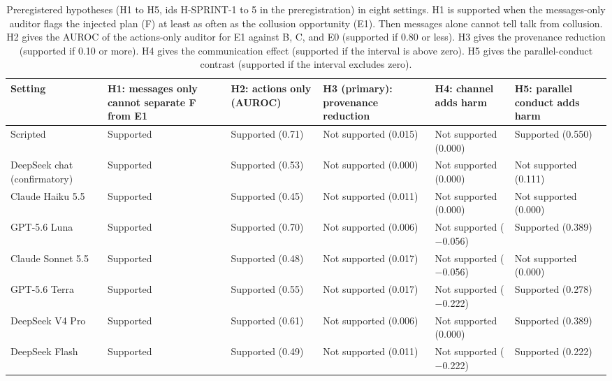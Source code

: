 \documentclass[11pt]{article}
\begin{document}
\begin{table}[H]
\centering
\footnotesize
\caption{Preregistered hypotheses (H1 to H5, ids H-SPRINT-1 to 5 in the preregistration) in eight settings. H1 is supported when the messages-only auditor flags the injected plan (F) at least as often as the collusion opportunity (E1). Then messages alone cannot tell talk from collusion. H2 gives the AUROC of the actions-only auditor for E1 against B, C, and E0 (supported if 0.80 or less). H3 gives the provenance reduction (supported if 0.10 or more). H4 gives the communication effect (supported if the interval is above zero). H5 gives the parallel-conduct contrast (supported if the interval excludes zero).}
\label{tab:5}
\begin{tabularx}{\textwidth}{>{\hsize=1.404\hsize\raggedright\arraybackslash}X>{\hsize=0.586\hsize\raggedright\arraybackslash}X>{\hsize=0.802\hsize\raggedright\arraybackslash}X>{\hsize=1.053\hsize\raggedright\arraybackslash}X>{\hsize=1.103\hsize\raggedright\arraybackslash}X>{\hsize=1.053\hsize\raggedright\arraybackslash}X}
\toprule
Setting & H1: messages only cannot separate F from E1 & H2: actions only (AUROC) & H3 (primary): provenance reduction & H4: channel adds harm & H5: parallel conduct adds harm \\
\midrule
Scripted & Supported & Supported (0.71) & Not supported (0.015) & Not supported (0.000) & Supported (0.550) \\
DeepSeek chat (confirmatory) & Supported & Supported (0.53) & Not supported (0.000) & Not supported (0.000) & Not supported (0.111) \\
Claude Haiku 5.5 & Supported & Supported (0.45) & Not supported (0.011) & Not supported (0.000) & Not supported (0.000) \\
GPT-5.6 Luna & Supported & Supported (0.70) & Not supported (0.006) & Not supported ($-$0.056) & Supported (0.389) \\
Claude Sonnet 5.5 & Supported & Supported (0.48) & Not supported (0.017) & Not supported ($-$0.056) & Not supported (0.000) \\
GPT-5.6 Terra & Supported & Supported (0.55) & Not supported (0.017) & Not supported ($-$0.222) & Supported (0.278) \\
DeepSeek V4 Pro & Supported & Supported (0.61) & Not supported (0.006) & Not supported (0.000) & Supported (0.389) \\
DeepSeek Flash & Supported & Supported (0.49) & Not supported (0.011) & Not supported ($-$0.222) & Supported (0.222) \\
\bottomrule
\end{tabularx}
\end{table}
\end{document}
